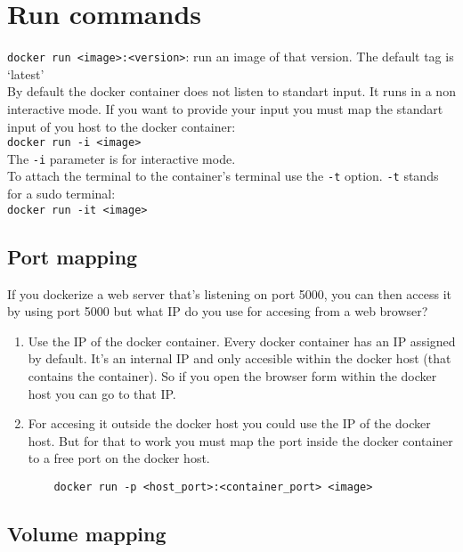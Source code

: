 \documentclass[french]{article}
\begin{document}
\section{Run commands}

\verb|docker run <image>:<version>|: run an image of that version. The default tag is `latest'\\

By default the docker container does not listen to standart input. It runs in a non interactive mode. If you want to provide your input you must map the standart input of you host to the docker container:\\

\verb|docker run -i <image>|\\

The \verb|-i| parameter is for interactive mode.\\
To attach the terminal to the container's terminal use the \verb|-t| option.  \verb|-t| stands for a sudo terminal:\\

\verb|docker run -it <image>|\\

\subsection{Port mapping}

If you dockerize a web server that's listening on port 5000, you can then access it by using port 5000 but what IP do you use for accesing from a web browser?
\begin{enumerate}
  \item Use the IP of the docker container. Every docker container has an IP assigned by default. It's an internal IP and only accesible within the docker host (that contains the container). So if you open the browser form within the docker host you can go to that IP.
  \item For accesing it outside the docker host you could use the IP of the docker host. But for that to work you must map the port inside the docker container to a free port on the docker host.
  \begin{verbatim}
    docker run -p <host_port>:<container_port> <image>
  \end{verbatim}
\end{enumerate}

\subsection{Volume mapping}
\end{document}
